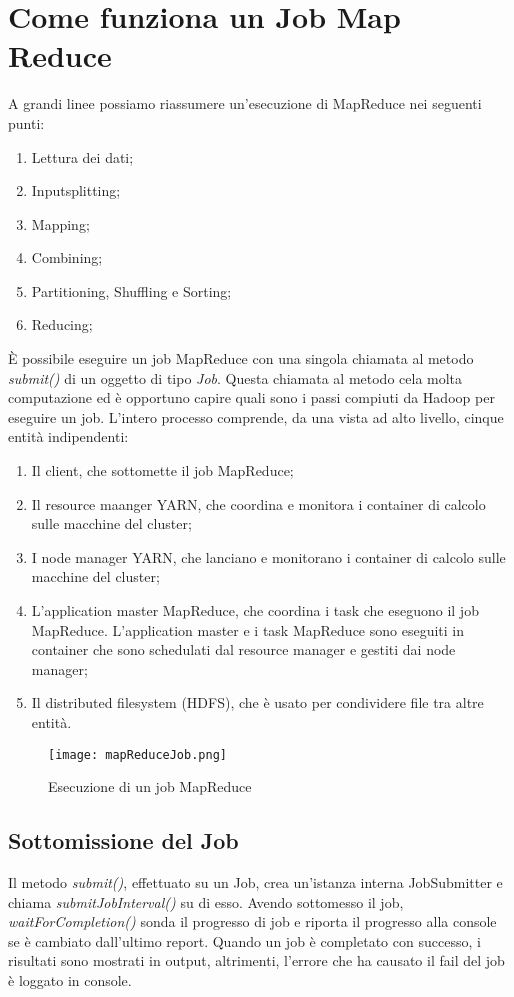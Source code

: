 \section{Come funziona un Job Map Reduce}
A grandi linee possiamo riassumere un'esecuzione di MapReduce nei seguenti punti:
\begin{enumerate}
  \item Lettura dei dati;
  \item Inputsplitting;
  \item Mapping;
  \item Combining; 
  \item Partitioning, Shuffling e Sorting;
  \item Reducing;
\end{enumerate}
È possibile eseguire un job MapReduce con una singola chiamata al metodo \textit{submit()} di un oggetto di tipo \textit{Job}. Questa chiamata al metodo cela molta computazione ed è opportuno capire quali sono i passi compiuti da Hadoop  per eseguire un job. L'intero processo comprende, da una vista ad alto livello, cinque entità indipendenti:
\begin{enumerate}
  \item Il client, che sottomette il job MapReduce;
  \item Il resource maanger YARN, che coordina e monitora i container di calcolo sulle macchine del cluster;
  \item I node manager YARN, che lanciano e monitorano i container di calcolo sulle macchine del cluster;
  \item L'application master MapReduce, che coordina i task che eseguono il job MapReduce. L'application master e i task MapReduce sono eseguiti in container che sono schedulati dal resource manager e gestiti dai node manager;
  \item Il distributed filesystem (HDFS), che è usato per condividere file tra altre entità.
\end{enumerate}
\begin{figure}[H]
  \begin{center}
    \texttt{[image: mapReduceJob.png]}
    \caption{Esecuzione di un job MapReduce}
    \label{fg:mapReduceJob.png}
  \end{center}
\end{figure}
\subsection{Sottomissione del Job}
Il metodo \textit{submit()}, effettuato su un Job, crea un'istanza interna JobSubmitter e chiama \textit{submitJobInterval()} su di esso. Avendo sottomesso il job, \textit{waitForCompletion()} sonda il progresso di job e riporta il progresso alla console se è cambiato dall'ultimo report. Quando un job è completato con successo, i risultati sono mostrati in output, altrimenti, l'errore che ha causato il fail del job è loggato in console.
